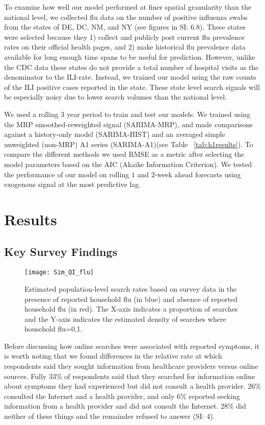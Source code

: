 \documentclass[fleqn,10pt]{wlscirep}
\begin{document}
To examine how well our model performed at finer spatial granularity than the national level, we collected flu data on the number of positive influenza swabs from the states of DE, DC, NM, and NY (see figures in SI: 6.8). These states were selected because they 1) collect and publicly post current flu prevalence rates on their official health pages, and 2) make historical flu prevalence data available for long enough time spans to be useful for prediction. However, unlike the CDC data these states do not provide a total number of hospital visits as the denominator to the ILI-rate. Instead, we trained our model using the raw counts of the ILI positive cases reported in the state. These state level search signals will be especially noisy due to lower search volumes than the national level. 

We used a rolling $3$ year period to train and test our models. We trained using the MRP smoothed-reweighted signal (SARIMA-MRP), and made comparisons against a history-only model (SARIMA-HIST) and an averaged simple unweighted (non-MRP) A1 series (SARIMA-A1)(see Table ~\ref{tab:h1results}). To compare the different methods we used RMSE as a metric after selecting the model parameters based on the AIC (Akaike Information Criterion). We tested the performance of our model on rolling $1$ and $2$-week ahead forecasts using exogenous signal at the most predictive lag.

\section*{Results}

\subsection*{Key Survey Findings}

\begin{figure}%
\centering
\texttt{[image: Sim\_QI\_flu]}
\caption{Estimated population-level search rates based on survey data in the presence of reported household flu (in blue) and absence of reported household flu (in red). The X-axis indicates a proportion of searches and the Y-axis indicates the estimated density of searches where household flu=0,1.}
\label{fig:A1search}
\end{figure}

Before discussing how online searches were associated with reported symptoms, it is worth noting that we found differences in the relative rate at which respondents said they sought information from healthcare providers versus online sources. Fully 33\% of respondents said that they searched for information online about symptoms they had experienced but did not consult a health provider. 26\% consulted the Internet and a health provider, and only 6\% reported seeking information from a health provider and did not consult the Internet. 28\% did neither of these things and the remainder refused to answer (SI: 4). 
\end{document}
